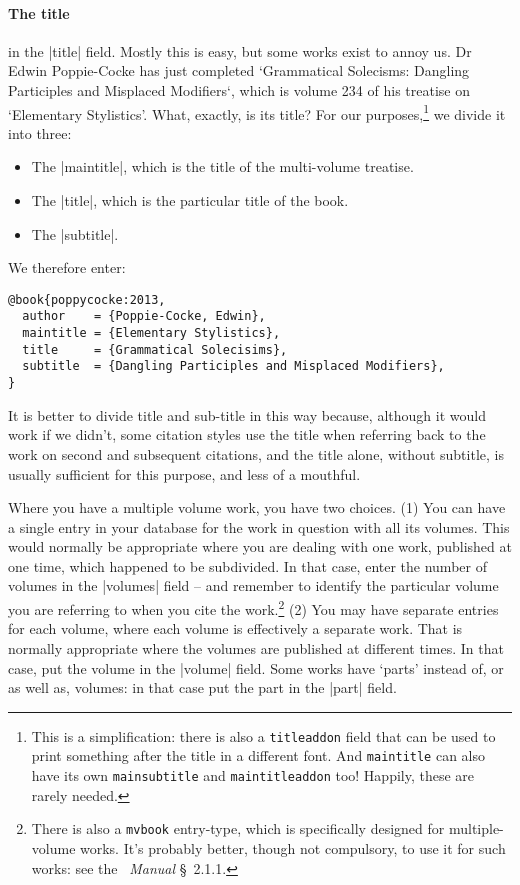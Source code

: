 {\paragraph{The title} in the |title| field. Mostly this is easy, but
some works exist to annoy us. Dr Edwin Poppie-Cocke has just completed
`Grammatical Solecisms: Dangling Participles and Misplaced Modifiers`,
which is volume 234 of his treatise on `Elementary Stylistics'. What,
exactly, is its title? For our purposes,\footnote{This is a
  simplification: there is also a \texttt{titleaddon} field that can
  be used to print something after the title in a different font. And
  \texttt{maintitle} can also have its own \texttt{mainsubtitle} and
  \texttt{maintitleaddon} too! Happily, these are rarely needed.} we
divide it into three:
\begin{itemize}
\item The |maintitle|, which is the title of the multi-volume
  treatise.
\item The |title|, which is the particular title of the book.
\item The |subtitle|.
\end{itemize}
We therefore enter:
\begin{Verbatim}
@book{poppycocke:2013,
  author    = {Poppie-Cocke, Edwin},
  maintitle = {Elementary Stylistics},
  title     = {Grammatical Solecisims},
  subtitle  = {Dangling Participles and Misplaced Modifiers},
}
\end{Verbatim}
It is better to divide title and sub-title in this way because,
although it would work if we didn't, some citation styles use the
title when referring back to the work on second and subsequent
citations, and the title alone, without subtitle, is usually
sufficient for this purpose, and less of a mouthful.

Where you have a multiple volume work, you have two choices. (1) You
can have a single entry in your database for the work in question with
all its volumes. This would normally be appropriate where you are
dealing with one work, published at one time, which happened to be
subdivided. In that case, enter the number of volumes in the |volumes|
field -- and remember to identify the particular volume you are
referring to when you cite the work.\footnote{There is also a
  \texttt{mvbook} entry-type, which is specifically designed for
  multiple-volume works. It's probably better, though not compulsory,
  to use it for such works: see the \biblatex\ \emph{Manual}
  \S~2.1.1.} (2) You may have separate entries for each volume, where
each volume is effectively a separate work. That is normally
appropriate where the volumes are published at different times. In
that case, put the volume in the |volume| field. Some works have
`parts' instead of, or as well as, volumes: in that case put the part
in the |part| field.

}
